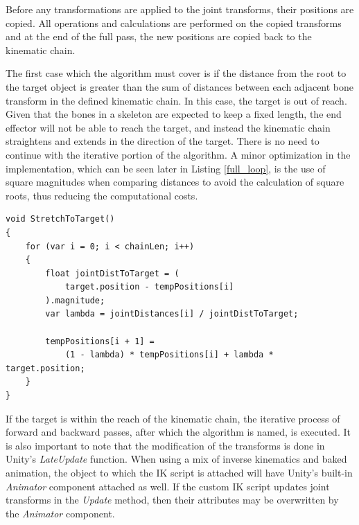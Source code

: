 Before any transformations are applied to the joint transforms, their positions
are copied. All operations and calculations are performed on the copied
transforms and at the end of the full pass, the new positions are copied back to
the kinematic chain.


The first case which the algorithm must cover is if the distance from the root
to the target object is greater than the sum of distances between each adjacent
bone transform in the defined kinematic chain. In this case, the target is out
of reach. Given that the bones in a skeleton are expected to keep a fixed
length, the end effector will not be able to reach the target, and instead the
kinematic chain straightens and extends in the direction of the target. There is
no need to continue with the iterative portion of the algorithm. A minor
optimization in the implementation, which can be seen later in Listing
\ref{full_loop}, is the use of square magnitudes when comparing distances to
avoid the calculation of square roots, thus reducing the computational costs.

\begin{lstlisting}[basicstyle=\footnotesize, numbers=none,frame=single, caption={Target out of
reach. \textit{Fabrik.cs}},captionpos=b, label=stretch, language={[Sharp]c}]
void StretchToTarget()
{
    for (var i = 0; i < chainLen; i++)
    {
        float jointDistToTarget = (
            target.position - tempPositions[i]
        ).magnitude;
        var lambda = jointDistances[i] / jointDistToTarget;

        tempPositions[i + 1] =
            (1 - lambda) * tempPositions[i] + lambda * target.position;
    }
}
\end{lstlisting}

If the target is within the reach of the kinematic chain, the iterative process
of forward and backward passes, after which the algorithm is named, is executed.
It is also important to note that the modification of the transforms is done in
Unity's \textit{LateUpdate} function. When using a mix of inverse kinematics and
baked animation, the object to which the IK script is attached will have Unity's
built-in \textit{Animator} component attached as well. If the custom IK script
updates joint transforms in the \textit{Update} method, then their attributes
may be overwritten by the \textit{Animator} component. 


